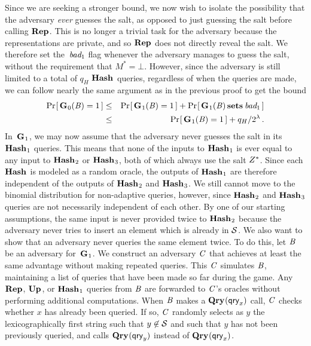 Since we are seeking a stronger bound, we now wish to isolate the possibility
that the adversary \emph{ever} guesses the salt, as opposed to just guessing the
salt before calling $\textup{\textbf{Rep}}\hspace{0.5pt}$. This is no longer a trivial task for the adversary
because the representations are private, and so $\textup{\textbf{Rep}}\hspace{0.5pt}$ does not directly reveal
the salt. We therefore set the~$\textit{bad}_1$ flag whenever the adversary manages to
guess the salt, without the requirement that $M^* = \bot$. However, since the
adversary is still limited to a total of $q_H$ $\textup{\textbf{Hash}}\hspace{0.5pt}$ queries, regardless of
when the queries are made, we can follow nearly the same argument as in the
previous proof to get the bound
%
\begin{eqnarray}
  \Pr\hspace{-1pt}\left[\,\textup{\textbf{G}}\hspace{0.5pt}_0(\mathit{B})=1\,\right] &\leq&
    \Pr\hspace{-1pt}\left[\,\textup{\textbf{G}}\hspace{0.5pt}_1(\mathit{B})=1\,\right] + \Pr\hspace{-1pt}\left[\,\textup{\textbf{G}}\hspace{0.5pt}_1(\mathit{B}) \,\textup{\textbf{sets}}\hspace{0.5pt}\, \textit{bad}_1\,\right]\\
  &\leq&
    \Pr\hspace{-1pt}\left[\,\textup{\textbf{G}}\hspace{0.5pt}_1(\mathit{B})=1\,\right] + q_H/2^\lambda \,.
\end{eqnarray}
%
In~$\textup{\textbf{G}}\hspace{0.5pt}_1$, we may now assume that the adversary never guesses the salt in its $\textup{\textbf{Hash}}\hspace{0.5pt}_1$ queries. This means that none of the inputs to $\textup{\textbf{Hash}}\hspace{0.5pt}_1$ is ever equal to any input to $\textup{\textbf{Hash}}\hspace{0.5pt}_2$ or $\textup{\textbf{Hash}}\hspace{0.5pt}_3$, both of which always use the salt $Z^*$. Since each $\textup{\textbf{Hash}}\hspace{0.5pt}$ is modeled as a random oracle, the outputs of $\textup{\textbf{Hash}}\hspace{0.5pt}_1$ are therefore independent of the outputs of $\textup{\textbf{Hash}}\hspace{0.5pt}_2$ and $\textup{\textbf{Hash}}\hspace{0.5pt}_3$.
%
We still cannot move to the binomial distribution for non-adaptive queries,
however, since $\textup{\textbf{Hash}}\hspace{0.5pt}_2$ and $\textup{\textbf{Hash}}\hspace{0.5pt}_3$ queries are not necessarily independent
of each other. By one of our starting assumptions, the same input is never
provided twice to $\textup{\textbf{Hash}}\hspace{0.5pt}_2$ because the adversary never tries to insert an
element which is already in $\mathcal{S}$. We also want to show that an adversary never
queries the same element twice. To do this, let $\mathit{B}$ be an adversary
for~$\textup{\textbf{G}}\hspace{0.5pt}_1$. We construct an adversary $\mathit{C}$ that achieves at least the same
advantage without making repeated queries. This $\mathit{C}$ simulates $\mathit{B}$,
maintaining a list of queries that have been made so far during the
game. Any $\textup{\textbf{Rep}}\hspace{0.5pt}$, $\textup{\textbf{Up}}\hspace{0.5pt}$, or $\textup{\textbf{Hash}}\hspace{0.5pt}_1$ queries from $\mathit{B}$ are forwarded to $\mathit{C}$'s
oracles without performing additional computations. When $\mathit{B}$ makes a
$\textup{\textbf{Qry}}\hspace{0.5pt}(\mathsf{qry}_x)$ call, $\mathit{C}$ checks whether $x$ has already been queried. If
so, $\mathit{C}$ randomly selects as $y$ the lexicographically first string such that
$y \not\in \mathcal{S}$ and such that $y$ has not been previously
queried, and calls $\textup{\textbf{Qry}}\hspace{0.5pt}(\mathsf{qry}_y)$ instead of $\textup{\textbf{Qry}}\hspace{0.5pt}(\mathsf{qry}_x)$.

